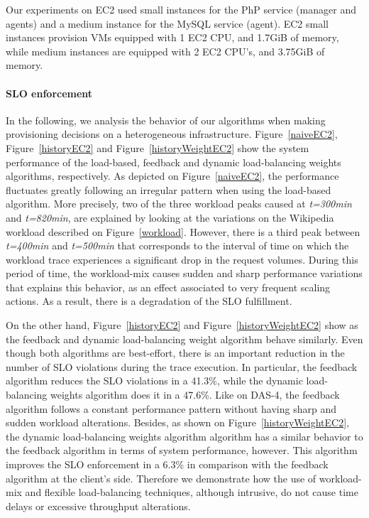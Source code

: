 Our experiments on EC2 used small instances for the PhP service (manager and agents) and  a medium instance for the MySQL service (agent). EC2 small instances provision VMs equipped with 1 EC2 CPU, and 1.7GiB of memory, while medium instances are equipped with 2 EC2 CPU's, and 3.75GiB of memory.

\paragraph{SLO enforcement}

In the following, we analysis the behavior of our algorithms when making provisioning decisions on a heterogeneous infrastructure. Figure~\ref{naiveEC2}, Figure~\ref{historyEC2} and Figure~\ref{historyWeightEC2} show the system performance of the load-based, feedback and dynamic load-balancing weights algorithms, respectively. As depicted on Figure~\ref{naiveEC2}, the performance fluctuates greatly following an irregular pattern when using the load-based algorithm. More precisely, two of the three workload peaks caused at \emph{t=300min} and \emph{t=820min}, are explained by looking at the variations on the Wikipedia workload described on Figure~\ref{workload}. However, there is a third peak between \emph{t=400min} and \emph{t=500min} that corresponds to the interval of time on which the workload trace experiences a significant drop in the request volumes. During this period of time, the workload-mix causes sudden and sharp performance variations that explains this behavior, as an effect associated to very frequent scaling actions. As a result, there is a degradation of the SLO fulfillment. 

On the other hand, Figure~\ref{historyEC2} and Figure~\ref{historyWeightEC2} show as the feedback and dynamic load-balancing weight algorithm behave similarly. Even though both algorithms are best-effort, there is an important reduction in the number of SLO violations during the trace execution. In particular, the feedback algorithm reduces the SLO violations in a  41.3\%, while the dynamic load-balancing weights algorithm does it in a 47.6\%. Like on DAS-4, the feedback algorithm follows a constant performance pattern without having sharp and sudden workload alterations. Besides, as shown on Figure~\ref{historyWeightEC2}, the dynamic load-balancing weights algorithm algorithm has a similar behavior to the feedback algorithm in terms of system performance, however. This algorithm improves the SLO enforcement in a 6.3\% in comparison with the feedback algorithm at the client's side. Therefore we demonstrate how the use of workload-mix and flexible load-balancing techniques, although intrusive, do not cause time delays or excessive throughput alterations. 



